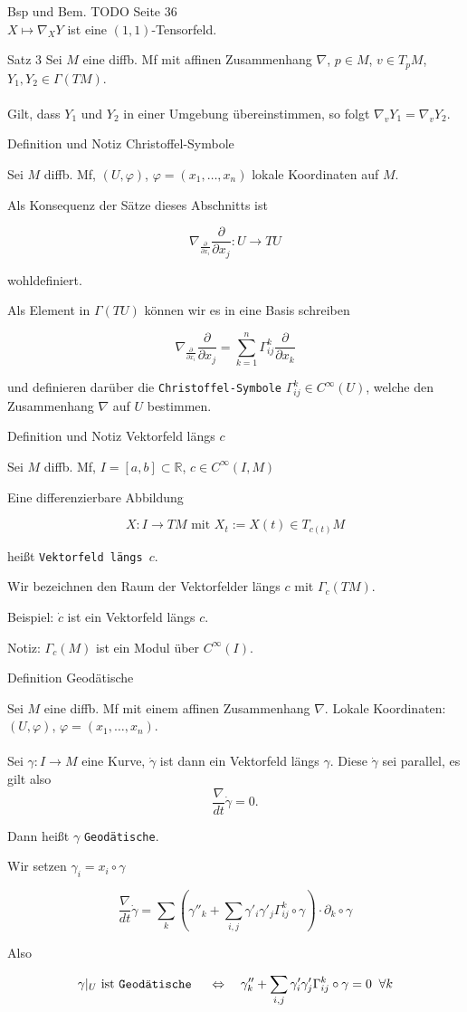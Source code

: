 \documentclass[a6paper,11pt,grid=front]{kartei}
\newcommand{\fl}[1]{\begin{flushleft}
 #1 \end{flushleft}}
\newcommand{\R}{\mathbb{R}}
\newcommand{\pd}[1][x_i]{\frac{\partial}{\partial {#1}}}
\newcounter{def}
\newcounter{satz}
\newcommand{\defreset}{\setcounter{def}{1}}
\newcommand{\satzreset}{\setcounter{satz}{1}}
\newcommand{\thisdef}{\thedef\stepcounter{def}}
\begin{document}
\nonameyet
{Bsp und Bem.} {}
{
TODO Seite 36
\\
$X\mapsto \nabla_X Y$ ist eine $(1,1)$-Tensorfeld.
}
{}

\nonameyet
{Satz 3} {}
{
Sei $M$ eine diffb. Mf mit affinen Zusammenhang $\nabla$, $p\in M$, $v\in T_pM$,
$Y_1,Y_2 \in \Gamma(TM)$.
\\
~\\
Gilt, dass  $Y_1$ und $Y_2$ in einer Umgebung übereinstimmen, so folgt 
$\nabla_v Y_1 = \nabla_v Y_2$.
}
{}

\nonameyet
{Definition und Notiz} {Christoffel-Symbole}
{
\small
Sei $M$ diffb. Mf, $(U,\varphi)$, $\varphi = (x_1,\dots,x_n)$ lokale
Koordinaten auf $M$.

\fl{Als Konsequenz der Sätze dieses Abschnitts ist}
\[
\nabla_{\pd} \pd[x_j] : U \to TU
\]
\fl{wohldefiniert.}
%
\fl{Als Element in $\Gamma(TU)$ können wir es in eine Basis schreiben }
\[
\nabla_{\pd} \pd[x_j] = \sum_{k=1}^n \Gamma^k_{ij} \pd[x_k]
\]
\fl{und definieren darüber die \texttt{Christoffel-Symbole} 
$\Gamma^k_{ij} \in C^\infty(U)$, welche den Zusammenhang $\nabla$ auf 
$U$ bestimmen.}
}
{}
\defreset
\satzreset

\nonameyet
{Definition \thisdef und Notiz} {Vektorfeld längs $c$}
{
Sei $M$ diffb. Mf, $I = [a,b] \subset \R$, $c\in C^\infty(I,M)$
\fl{Eine differenzierbare Abbildung  }
\[
X: I \to TM \text{ mit } X_t := X(t)\in T_{c(t)}M
\]
\fl{heißt \texttt{Vektorfeld längs $c$}.}
\fl{Wir bezeichnen den Raum der Vektorfelder längs $c$ mit $\Gamma_c(TM)$.}

\fl{Beispiel: $\dot c$ ist ein Vektorfeld längs $c$.}
\fl{Notiz: $\Gamma_c(M)$ ist ein Modul über $C^\infty(I)$.}
}
{}


\nonameyet
{Definition} {Geodätische}
{
\scriptsize
Sei $M$ eine diffb. Mf mit einem affinen Zusammenhang $\nabla$.
Lokale Koordinaten: $(U,\varphi)$, $\varphi = (x_1,\dots,x_n)$.
%
\\
~\\
\small
Sei $\gamma : I \to M$ eine Kurve, $\dot \gamma $ ist dann ein Vektorfeld
längs $\gamma$. Diese $\dot \gamma$ sei parallel, es gilt also
\[
\frac{\nabla}{dt} \dot\gamma = 0.
\]
\fl{Dann heißt $\gamma$ \texttt{Geodätische}.}
\footnotesize
\fl{Wir setzen $\gamma_i = x_i \circ \gamma$}
\[
\frac{\nabla}{dt} \dot \gamma 
= \sum_k \left( 
\gamma''_k + \sum_{i,j} \gamma'_i \gamma'_j \Gamma^k_{ij}\circ \gamma
\right) 
\cdot \partial_k \circ \gamma
\]
\fl{Also}
\[
\gamma|_U \text{ ist \texttt{Geodätische} }
\quad \Leftrightarrow \quad
\gamma''_k + \sum_{i,j} \gamma'_i \gamma'_j \Gamma^k_{ij}\circ \gamma = 0
\;\; \forall k
\]
}
{}
\end{document}
